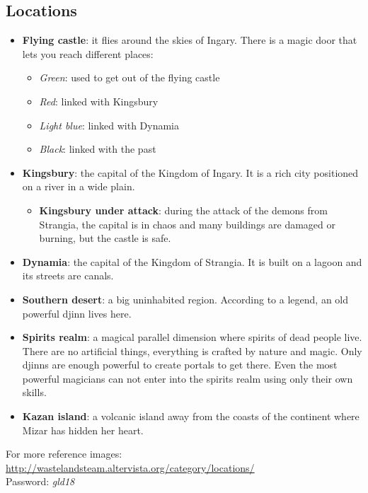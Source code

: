 \subsection{Locations}
\begin{itemize}
	\item \textbf{Flying castle}: it flies around the skies of Ingary. There is a magic door that lets you reach different places:
	\begin{itemize}
		\item \textit{Green}: used to get out of the flying castle
		\item \textit{Red}: linked with Kingsbury
		\item \textit{Light blue}: linked with Dynamia
		\item \textit{Black}: linked with the past
	\end{itemize}
	
	\item \textbf{Kingsbury}: the capital of the Kingdom of Ingary. It is a rich city positioned on a river in a wide plain.
	
\begin{itemize}
	\item \textbf{Kingsbury under attack}: during the attack of the demons from Strangia, the capital is in chaos and many buildings are damaged or burning, but the castle is safe.
\end{itemize}
	
	\item \textbf{Dynamia}: the capital of the Kingdom of Strangia. It is built on a lagoon and its streets are canals.
	
	\item \textbf{Southern desert}: a big uninhabited region. According to a legend, an old powerful djinn lives here.
	
	\item \textbf{Spirits realm}: a magical parallel dimension where spirits of dead people live. There are no artificial things, everything is crafted by nature and magic. Only djinns are enough powerful to create portals to get there. Even the most powerful magicians can not enter into the spirits realm using only their own skills.

	\item \textbf{Kazan island}: a volcanic island away from the coasts of the continent where Mizar has hidden her heart.
	
\end{itemize}
For more reference images: \href{http://wastelandsteam.altervista.org/category/locations/}{http://wastelandsteam.altervista.org/category/locations/}\\
Password: \textit{gld18}

